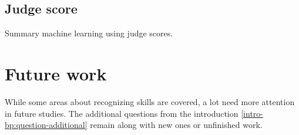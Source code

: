 \subsection{Judge score}


Summary machine learning using judge scores.

\section{Future work}

While some areas about recognizing skills are covered, a lot need more attention in future studies. The additional questions from the introduction \ref{intro-bp:question-additional} remain along with new ones or unfinished work.


